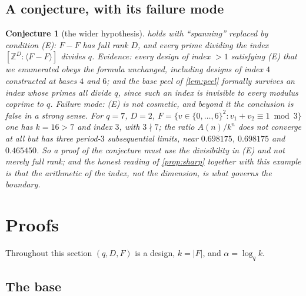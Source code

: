 \documentclass[11pt]{amsart}
\newtheorem{conjecture}[theorem]{Conjecture}
\theoremstyle{definition}
\theoremstyle{remark}
\begin{document}
\subsection{A conjecture, with its failure mode}

\begin{conjecture}[the wider hypothesis]
\label{con:E}
 holds with ``spanning'' replaced by condition (E): $F-F$ has full rank $D$, and every prime dividing the index $[\mathbb{Z}^{D} : \langle F-F\rangle]$ divides $q$. Evidence: every design of index $>1$ satisfying (E) that we enumerated obeys the formula unchanged, including designs of index $4$ constructed at bases $4$ and $6$; and the base peel of \cref{lem:peel} formally survives an index whose primes all divide $q$, since such an index is invisible to every modulus coprime to $q$. Failure mode: (E) is not cosmetic, and beyond it the conclusion is false in a strong sense. For $q=7$, $D=2$, $F = \{v \in \{0,\dots,6\}^{2} : v_1+v_2 \equiv 1 \bmod 3\}$ one has $k=16>7$ and index $3$, with $3 \nmid 7$; the ratio $A(n)/k^{n}$ does not converge at all but has three period-$3$ subsequential limits, near $0.698175$, $0.698175$ and $0.465450$. So a proof of the conjecture must use the divisibility in (E) and not merely full rank; and the honest reading of \cref{prop:sharp} together with this example is that the arithmetic of the index, not the dimension, is what governs the boundary.
\end{conjecture}

\section{Proofs}
\label{sec:proofs}

Throughout this section $(q,D,F)$ is a design, $k=|F|$, and $\alpha = \log_q k$.

\subsection{The base}
\end{document}
